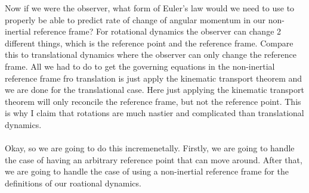 Now if we were the observer, what form of Euler's law would we need to use to properly be able to predict rate of change of angular momentum in our non-inertial reference frame?
For rotational dynamics the observer can change 2 different things, which is the reference point and the reference frame.
Compare this to translational dynamics where the observer can only change the reference frame.
All we had to do to get the governing equations in the non-inertial reference frame fro translation is just apply the kinematic transport theorem and we are done for the translational case.
Here just applying the kinematic transport theorem will only reconcile the reference frame, but not the reference point.
This is why I claim that rotations are much nastier and complicated than translational dynamics.
\\~\\Okay, so we are going to do this incremenetally.
Firstly, we are going to handle the case of having an arbitrary reference point that can move around.
After that, we are going to handle the case of using a non-inertial reference frame for the definitions of our roational dynamics.


